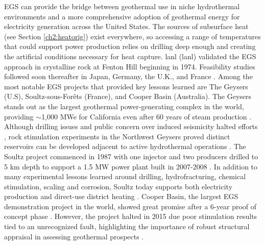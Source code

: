 EGS can provide the bridge between geothermal use in niche hydrothermal environments and a more comprehensive adoption of geothermal energy for electricity generation across the United States. The sources of subsurface heat (see Section \ref{ch2:heatorig}) exist everywhere, so accessing a range of temperatures that could support power production relies on drilling deep enough and creating the artificial conditions necessary for heat capture. \acrlong{lanl} (\acrshort{lanl}) validated the EGS approach in crystalline rock at Fenton Hill beginning in 1974. Feasibility studies followed soon thereafter in Japan, Germany, the U.K., and France \citep{breede_systematic_2013}. Among the most notable EGS projects that provided key lessons learned are The Geysers (U.S), Soultz-sous-Forêts (France), and Cooper Basin (Australia). The Geysers stands out as the largest geothermal power-generating complex in the world, providing $\sim$1,000 MWe for California even after 60 years of steam production \citep{jelacic_evaluation_2008,williams_assessment_2008}. Although drilling issues and public concern over induced seismicity halted efforts \citep{manish03_united_2009}, rock stimulation experiments in the Northwest Geysers proved distinct reservoirs can be developed adjacent to active hydrothermal operations \citep{pan_establishment_2019}. The Soultz project commenced in 1987 with one injector and two producers drilled to 5 km depth to support a 1.5 MW power plant built in 2007-2008 \citep[p.\ 463]{dipippo_geothermal_2012}. In addition to many experimental lessons learned around drilling, hydrofracturing, chemical stimulation, scaling and corrosion, Soultz today supports both electricity production and direct-use district heating \citep{durst_overview_2013}. Cooper Basin, the largest EGS demonstration project in the world, showed great promise after a 6-year proof of concept phase \citep{stephens_assessing_2010}. However, the project halted in 2015 due poor stimulation results tied to an unrecognized fault, highlighting the importance of robust structural appraisal in assessing geothermal prospects \citep{holl_what_2015}. 


